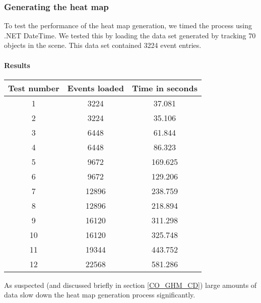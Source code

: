 \subsubsection{Generating the heat map}
\label{Test_P_Generating}
To test the performance of the heat map generation, we timed the process using .NET DateTime. We tested this by loading the data set generated by tracking 70 objects in the scene. This data set contained 3224 event entries.

\paragraph{Results}
\begin{center}
\begin{tabular}{| c | c | c |}
\hline
Test number & Events loaded & Time in seconds \\ 
\hline
1 & 3224 & 37.081 \\ 
\hline
2 & 3224 & 35.106 \\ 
\hline
3 & 6448 & 61.844 \\ 
\hline
4 & 6448 & 86.323 \\ 
\hline
5 & 9672 & 169.625 \\
\hline
6 & 9672 &  129.206 \\
\hline
7 & 12896 & 238.759 \\
\hline
8 & 12896 & 218.894 \\
\hline
9 & 16120 & 311.298 \\
\hline
10 & 16120 & 325.748 \\
\hline
11 & 19344 & 443.752 \\
\hline 
12 & 22568 & 581.286 \\
\hline
\end{tabular}
\end{center}
As suspected (and discussed briefly in section \ref{CO_GHM_CD}) large amounts of data slow down the heat map generation process significantly. 

